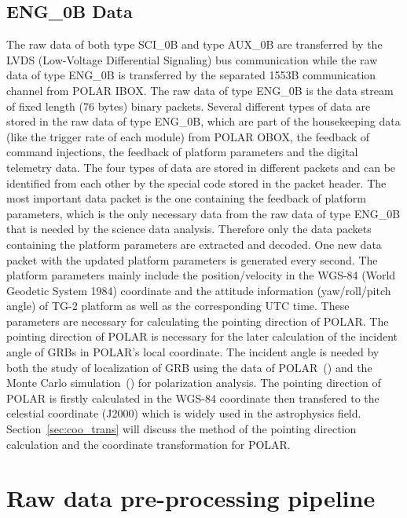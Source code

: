 \documentclass{raa}
\begin{document}
\subsection{ENG\_0B Data}
The raw data of both type SCI\_0B and type AUX\_0B are transferred by the LVDS (Low-Voltage Differential Signaling) bus communication while the raw data of type ENG\_0B is transferred by the separated 1553B communication channel from POLAR IBOX. The raw data of type ENG\_0B is the data stream of fixed length (76 bytes) binary packets. Several different types of data are stored in the raw data of type ENG\_0B, which are part of the housekeeping data (like the trigger rate of each module) from POLAR OBOX, the feedback of command injections, the feedback of platform parameters and the digital telemetry data. The four types of data are stored in different packets and can be identified from each other by the special code stored in the packet header. The most important data packet is the one containing the feedback of platform parameters, which is the only necessary data from the raw data of type ENG\_0B that is needed by the science data analysis. Therefore only the data packets containing the platform parameters are extracted and decoded. One new data packet with the updated platform parameters is generated every second. The platform parameters mainly include the position/velocity in the WGS-84 (World Geodetic System 1984) coordinate and the attitude information (yaw/roll/pitch angle) of TG-2 platform as well as the corresponding UTC time. These parameters are necessary for calculating the pointing direction of POLAR. The pointing direction of POLAR is necessary for the later calculation of the incident angle of GRBs in POLAR's local coordinate. The incident angle is needed by both the study of localization of GRB using the data of POLAR~(\citealt{SUAREZGARCIA2010624}) and the Monte Carlo simulation~(\citealt{Kole2017}) for polarization analysis. The pointing direction of POLAR is firstly calculated in the WGS-84 coordinate then transfered to the celestial coordinate (J2000) which is widely used in the astrophysics field. Section~\ref{sec:coo_trans} will discuss the method of the pointing direction calculation and the coordinate transformation for POLAR.

\section{Raw data pre-processing pipeline}
\end{document}
